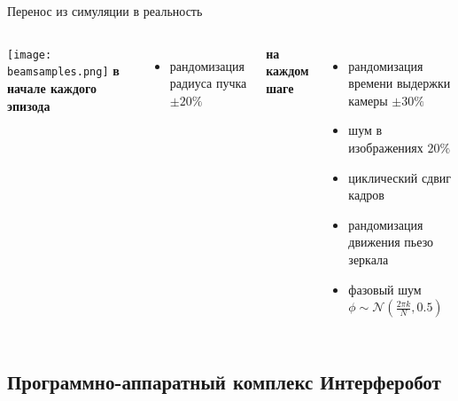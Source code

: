 \begin{frame}{Перенос из симуляции в реальность}
\begin{columns}
\centering
\texttt{[image: beamsamples.png]}
\textbf{в начале каждого эпизода}
\begin{itemize}
    \item рандомизация радиуса пучка $\pm 20\%$
\end{itemize}
\textbf{на каждом шаге}
\begin{itemize}
    \item рандомизация времени выдержки камеры $\pm 30\%$
    \item шум в изображениях $20\%$
    \item циклический сдвиг кадров
    \item рандомизация движения пьезо зеркала
    \item фазовый шум $\phi \sim \mathcal{N}(\frac{2\pi k}{N}, 0.5)$
\end{itemize}
\end{columns}
\end{frame}

\subsection{Программно-аппаратный комплекс Интерферобот}

